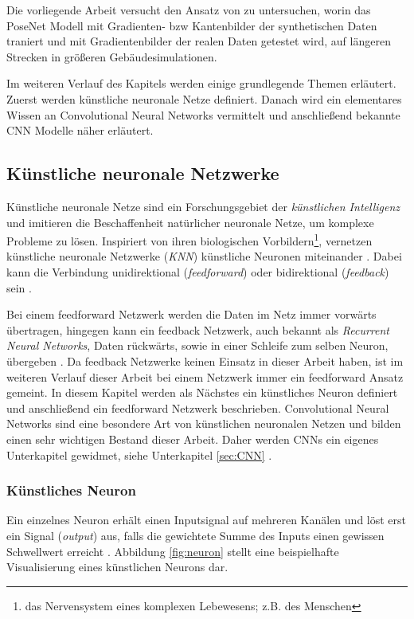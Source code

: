 Die vorliegende Arbeit versucht den Ansatz von \citet{acharyaBIMPoseNetIndoorCamera2019} zu untersuchen, worin das PoseNet Modell mit Gradienten- bzw Kantenbilder der synthetischen Daten traniert und mit Gradientenbilder der realen Daten getestet wird, auf längeren Strecken in größeren Gebäudesimulationen.

Im weiteren Verlauf des Kapitels werden einige grundlegende Themen erläutert. Zuerst werden künstliche neuronale Netze definiert. Danach wird ein elementares Wissen an Convolutional Neural Networks vermittelt und anschließend bekannte CNN Modelle näher erläutert.


\subsection{Künstliche neuronale Netzwerke}
\label{sec:KNN}
Künstliche neuronale Netze sind ein Forschungsgebiet der \textit{künstlichen Intelligenz} und imitieren die Beschaffenheit natürlicher neuronale Netze, um komplexe Probleme zu lösen. Inspiriert von ihren biologischen Vorbildern\footnote{das Nervensystem eines komplexen Lebewesens; z.B. des Menschen}, vernetzen künstliche neuronale Netzwerke (\textit{KNN}) künstliche Neuronen miteinander \cite{CS231nConvolutionalNeural}. Dabei kann die Verbindung unidirektional (\textit{feedforward}) oder bidirektional (\textit{feedback}) sein  \cite{Goodfellow-et-al-2016}. 

Bei einem feedforward Netzwerk werden die Daten im Netz immer vorwärts übertragen, hingegen kann ein feedback Netzwerk, auch bekannt als \textit{Recurrent Neural Networks}, Daten rückwärts, sowie in einer Schleife zum selben Neuron, übergeben \cite{Goodfellow-et-al-2016}. Da feedback Netzwerke keinen Einsatz in dieser Arbeit haben, ist im weiteren Verlauf dieser Arbeit bei einem Netzwerk immer ein feedforward Ansatz gemeint. In diesem Kapitel werden als Nächstes ein künstliches Neuron definiert und anschließend ein feedforward Netzwerk beschrieben. Convolutional Neural Networks sind eine besondere Art von künstlichen neuronalen Netzen und bilden einen sehr wichtigen Bestand dieser Arbeit. Daher werden CNNs ein eigenes Unterkapitel gewidmet, siehe Unterkapitel \ref{sec:CNN} .


\subsubsection{Künstliches Neuron}
Ein einzelnes Neuron erhält einen Inputsignal auf mehreren Kanälen und löst erst ein Signal (\textit{output}) aus, falls die gewichtete Summe des Inputs einen gewissen Schwellwert erreicht \cite{CS231nConvolutionalNeural}. Abbildung \ref{fig:neuron} stellt eine beispielhafte Visualisierung eines künstlichen Neurons dar.

